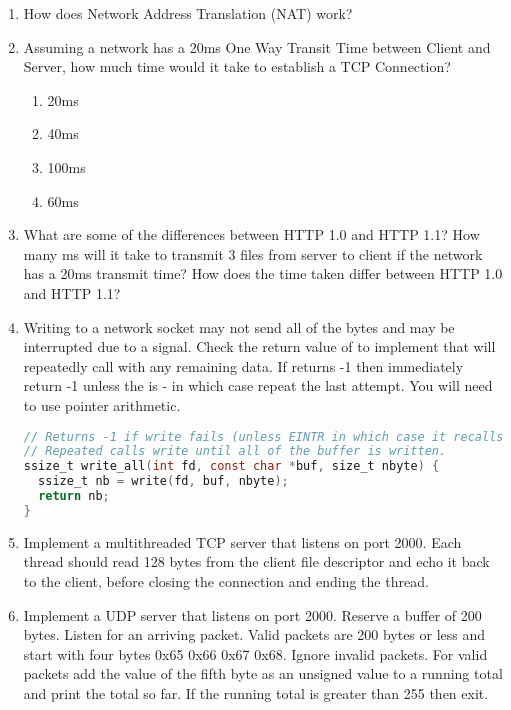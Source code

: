 \begin{enumerate}
\item How does Network Address Translation (NAT) work?

\item Assuming a network has a 20ms One Way Transit Time between Client and Server, how much time would it take to establish a TCP Connection?
  \begin{enumerate}
  \item 20ms
  \item 40ms
  \item 100ms
  \item 60ms
  \end{enumerate}

\item What are some of the differences between HTTP 1.0 and HTTP 1.1? How many ms will it take to transmit 3 files from server to client if the network has a 20ms transmit time? How does the time taken differ between HTTP 1.0 and HTTP 1.1?

\item Writing to a network socket may not send all of the bytes and may be interrupted due to a signal. Check the return value of  to implement  that will repeatedly call  with any remaining data. If  returns -1 then immediately return -1 unless the  is  - in which case repeat the last  attempt. You will need to use pointer arithmetic.

\begin{lstlisting}[language=C]
// Returns -1 if write fails (unless EINTR in which case it recalls write
// Repeated calls write until all of the buffer is written.
ssize_t write_all(int fd, const char *buf, size_t nbyte) {
  ssize_t nb = write(fd, buf, nbyte);
  return nb;
}
\end{lstlisting}

\item Implement a multithreaded TCP server that listens on port 2000. Each thread should read 128 bytes from the client file descriptor and echo it back to the client, before closing the connection and ending the thread.

\item Implement a UDP server that listens on port 2000. Reserve a buffer of 200 bytes. Listen for an arriving packet. Valid packets are 200 bytes or less and start with four bytes 0x65 0x66 0x67 0x68. Ignore invalid packets. For valid packets add the value of the fifth byte as an unsigned value to a running total and print the total so far. If the running total is greater than 255 then exit.

\end{enumerate}

